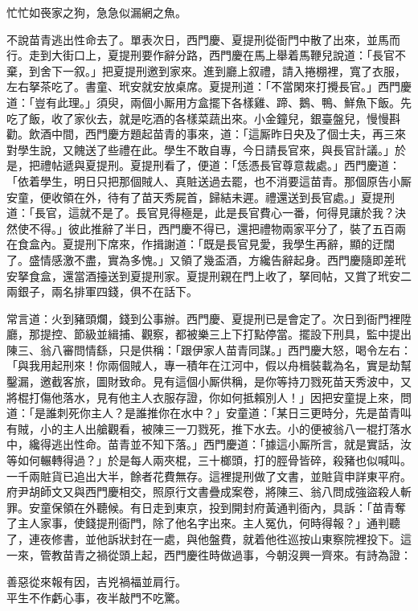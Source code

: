 \begin{myquote}
忙忙如䘮家之狗，急急似漏網之魚。
\end{myquote}

不說苗青逃出性命去了。單表次日，西門慶、夏提刑從衙門中散了出來，並馬而行。走到大街口上，夏提刑要作辭分路，西門慶在馬上舉着馬鞭兒說道：「長官不棄，到舍下一叙。」把夏提刑邀到家來。進到廳上叙禮，請入捲棚裡，寬了衣服，左右拏茶吃了。書童、玳安就安放桌席。夏提刑道：「不當閑來打攪長官。」西門慶道：「豈有此理。」須臾，兩個小厮用方盒擺下各樣雞、蹄、鵝、鴨、鮮魚下飯。先吃了飯，收了家伙去，就是吃酒的各樣菜蔬出來。小金鐘兒，銀臺盤兒，慢慢斟勸。飲酒中間，西門慶方題起苗青的事來，道：「這厮昨日央及了個士夫，再三來對學生說，又餽送了些禮在此。學生不敢自專，今日請長官來，與長官計議。」於是，把禮帖遞與夏提刑。夏提刑看了，便道：「恁憑長官尊意裁處。」西門慶道：「依着學生，明日只把那個賊人、真賍送過去罷，也不消要這苗青。那個原告小厮安童，便收領在外，待有了苗天秀屍首，歸結未遲。禮還送到長官處。」夏提刑道：「長官，這就不是了。長官見得極是，此是長官費心一番，何得見讓於我？決然使不得。」彼此推辭了半日，西門慶不得已，還把禮物兩家平分了，裝了五百兩在食盒內。夏提刑下席來，作揖謝道：「既是長官見愛，我學生再辭，顯的迂闊了。盛情感激不盡，實為多愧。」又領了幾盃酒，方纔告辭起身。西門慶隨即差玳安拏食盒，還當酒擡送到夏提刑家。夏提刑親在門上收了，拏囘帖，又賞了玳安二兩銀子，兩名排軍四錢，俱不在話下。

常言道：火到豬頭爛，錢到公事辦。西門慶、夏提刑已是會定了。次日到衙門裡陞廳，那提控、節級並緝捕、觀察，都被樂三上下打點停當。擺設下刑具，監中提出陳三、翁八審問情繇，只是供稱：「跟伊家人苗青同謀。」西門慶大怒，喝令左右：「與我用起刑來！你兩個賊人，專一積年在江河中，假以舟楫裝載為名，實是劫幫鑿漏，邀截客旅，圖財致命。見有這個小厮供稱，是你等持刀戮死苗天秀波中，又將棍打傷他落水，見有他主人衣服存證，你如何抵賴別人！」因把安童提上來，問道：「是誰刺死你主人？是誰推你在水中？」安童道：「某日三更時分，先是苗青叫有賊，小的主人出艙觀看，被陳三一刀戮死，推下水去。小的便被翁八一棍打落水中，纔得逃出性命。苗青並不知下落。」西門慶道：「據這小厮所言，就是實話，汝等如何輾轉得過？」於是每人兩夾棍，三十榔頭，打的脛骨皆碎，殺豬也似喊叫。一千兩賍貨已追出大半，餘者花費無存。這裡提刑做了文書，並賍貨申詳東平府。府尹胡師文又與西門慶相交，照原行文書疊成案卷，將陳三、翁八問成強盜殺人斬罪。安童保領在外聽候。有日走到東京，投到開封府黃通判衙內，具訴：「苗青奪了主人家事，使錢提刑衙門，除了他名字出來。主人冤仇，何時得報？」通判聽了，連夜修書，並他訴狀封在一處，與他盤費，就着他徃巡按山東察院裡投下。這一來，管教苗青之禍從頭上起，西門慶徃時做過事，今朝沒興一齊來。有詩為證：

\begin{myquote}
善惡從來報有因，吉兇禍福並肩行。\\平生不作虧心事，夜半敲門不吃驚。
\end{myquote}


